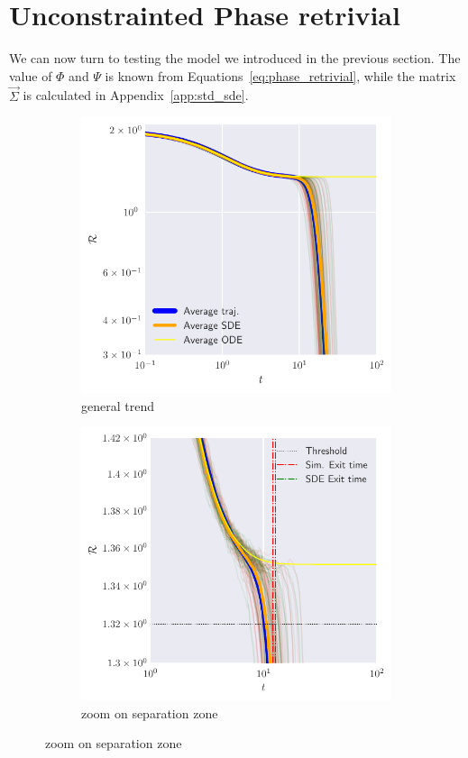 \section{Unconstrainted Phase retrivial}
We can now turn to testing the model we introduced in the previous section.
The value of \(\Phi\) and \(\Psi\) is known from Equations~\eqref{eq:phase_retrivial},
while the matrix \(\vec{\Sigma}\) is calculated in Appendix~\ref{app:std_sde}.

\begin{figure}
  \centering
  \begin{subfigure}{0.75\textwidth}
    \includegraphics[width=1.\textwidth]{figures/sde/unconstrainted-sde-example.pdf}
    \caption{general trend}
  \end{subfigure}
  \begin{subfigure}{0.75\textwidth}
    \includegraphics[width=1.\textwidth]{figures/sde/unconstrainted-sde-example-zoom.pdf}
    \caption{zoom on separation zone}
  \end{subfigure}


\end{figure}
